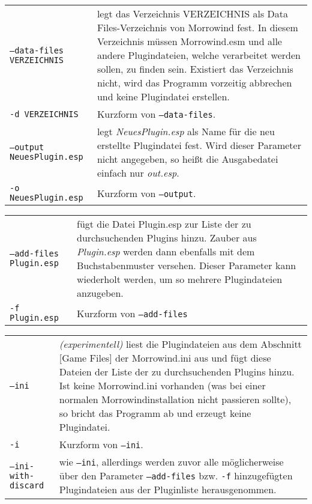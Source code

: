 \documentclass[12pt,twoside,a4paper]{article}
\begin{document}
\begin{tabular}{p{7cm} p{8cm}}
\texttt{--data-files VERZEICHNIS} & legt das Verzeichnis VERZEICHNIS als Data Files-Verzeichnis von Morrowind fest. In diesem Verzeichnis m\"{u}ssen Morrowind.esm und alle andere Plugindateien, welche verarbeitet werden sollen, zu finden sein. Existiert das Verzeichnis nicht, wird das Programm vorzeitig abbrechen und keine Plugindatei erstellen.\\
\texttt{-d VERZEICHNIS}           & Kurzform von \texttt{--data-files}.\\
\texttt{--output NeuesPlugin.esp} & legt \textit{NeuesPlugin.esp} als Name f\"{u}r die neu erstellte Plugindatei fest. Wird dieser Parameter nicht angegeben, so heißt die Ausgabedatei einfach nur \textit{out.esp}.\\
\texttt{-o NeuesPlugin.esp}       & Kurzform von \texttt{--output}.\\
\end{tabular}
\newline
\begin{tabular}{p{7cm} p{8cm}}
\texttt{--add-files Plugin.esp}   & f\"{u}gt die Datei Plugin.esp zur Liste der zu durchsuchenden Plugins hinzu. Zauber aus \textit{Plugin.esp} werden dann ebenfalls mit dem Buchstabenmuster versehen. Dieser Pa\-ra\-me\-ter kann wiederholt werden, um so mehrere Plugindateien anzugeben.\\
\texttt{-f Plugin.esp}            & Kurzform von \texttt{--add-files}\\
\end{tabular}
\newline
\begin{tabular}{p{7cm} p{8cm}}
\texttt{--ini}                    & \textit{(experimentell)} liest die Plugindateien aus dem Abschnitt [Game Files] der Morrowind.ini aus und f\"{u}gt diese Dateien der Liste der zu durchsuchenden Plugins hinzu. Ist keine Morrowind.ini vorhanden (was bei einer normalen Morrowindinstallation nicht passieren sollte), so bricht das Programm ab und erzeugt keine Plugindatei.\\
\texttt{-i}                       & Kurzform von \texttt{--ini}.\\
\texttt{--ini-with-discard}       & wie \texttt{--ini}, allerdings werden zuvor alle m\"{o}glicherweise \"{u}ber den Parameter \texttt{--add-files} bzw. \texttt{-f} hinzugef\"{u}gten Plugindateien aus der Pluginliste herausgenommen.\\
\end{tabular}
\newline
\end{document}
